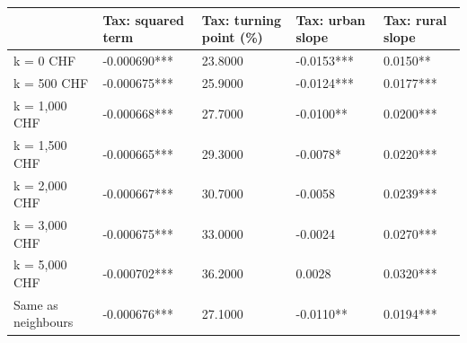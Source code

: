 \begin{tabular}{lllll}
\toprule
 & Tax: squared term & Tax: turning point (\%) & Tax: urban slope & Tax: rural slope \\
\midrule
k = 0 CHF & -0.000690*** & 23.8000 & -0.0153*** & 0.0150** \\
k = 500 CHF & -0.000675*** & 25.9000 & -0.0124*** & 0.0177*** \\
k = 1,000 CHF & -0.000668*** & 27.7000 & -0.0100** & 0.0200*** \\
k = 1,500 CHF & -0.000665*** & 29.3000 & -0.0078* & 0.0220*** \\
k = 2,000 CHF & -0.000667*** & 30.7000 & -0.0058 & 0.0239*** \\
k = 3,000 CHF & -0.000675*** & 33.0000 & -0.0024 & 0.0270*** \\
k = 5,000 CHF & -0.000702*** & 36.2000 & 0.0028 & 0.0320*** \\
Same as neighbours & -0.000676*** & 27.1000 & -0.0110** & 0.0194*** \\
\bottomrule
\end{tabular}
